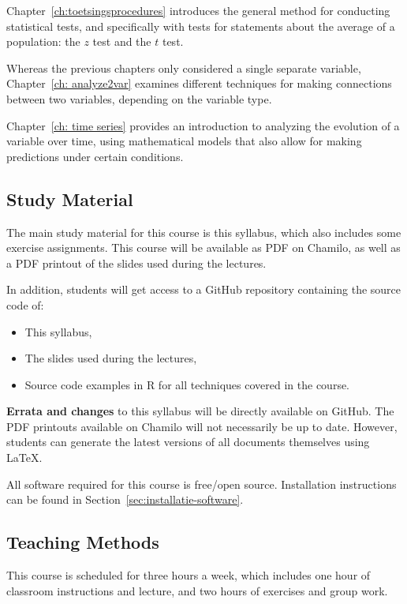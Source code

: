 Chapter~\ref{ch:toetsingsprocedures} introduces the general method for conducting statistical tests, and specifically with tests for statements about the average of a population: the $ z $ test and the $ t $ test.

Whereas the previous chapters only considered a single separate variable, Chapter~\ref{ch: analyze2var} examines different techniques for making connections between two variables, depending on the variable type.

Chapter~\ref{ch: time series} provides an introduction to analyzing the evolution of a variable over time, using mathematical models that also allow for making predictions under certain conditions.

\subsection{Study Material}

The main study material for this course is this syllabus, which also includes some exercise assignments. 
This course will be available as PDF on Chamilo, as well as a PDF printout of the slides used during the lectures.

In addition, students will get access to a GitHub repository containing the source code of:

\begin{itemize}
    \item This syllabus,
    \item The slides used during the lectures,
    \item Source code examples in R for all techniques covered in the course.
\end{itemize}

\textbf{Errata and changes} to this syllabus will be directly available on GitHub.
The PDF printouts available on Chamilo will not necessarily be up to date.
However, students can generate the latest versions of all documents themselves using \LaTeX{}.

All software required for this course is free/open source.
Installation instructions can be found in Section~\ref{sec:installatie-software}.

\subsection{Teaching Methods}

This course is scheduled for three hours a week, which includes one hour of classroom instructions and lecture, and two hours of exercises and group work.

